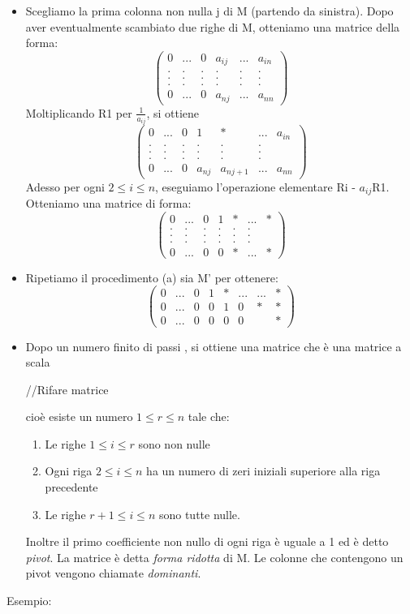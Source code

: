 \documentclass[12pt]{article}
\begin{document}
\begin{itemize}
    \item Scegliamo la prima colonna non nulla j di M (partendo da sinistra). Dopo aver eventualmente scambiato due righe di M, otteniamo una matrice della forma:
    \[\begin{pmatrix}
        0 & ... & 0 & a_{ij} & ... & a_{in}\\
        . & . & . & . & . & .\\
        . & . & . & . & . & .\\
        . & . & . & . & . & .\\
        0 & ... & 0 & a_{nj} & ... & a_{nn}
    \end{pmatrix}\]
    Moltiplicando R1 per $\frac{1}{a_{ij}}$, si ottiene
    \[\begin{pmatrix}
        0 & ... & 0 & 1 & * & ... & a_{in}\\
        . & . & . & . & . & .\\
        . & . & . & . & . & .\\
        . & . & . & . & . & .\\
        0 & ... & 0 & a_{nj} & a_{nj+1} & ... & a_{nn}
    \end{pmatrix}\]
    Adesso per ogni $2 \le i \le n$, eseguiamo l'operazione elementare Ri - $a_{ij}$R1. Otteniamo una matrice di forma:
    \[\begin{pmatrix}
        0 & ... & 0 & 1 & * & ... & * \\
        . & . & . & . & . & .\\
        . & . & . & . & . & .\\
        . & . & . & . & . & .\\
        0 & ... & 0 & 0 & * & ... & *
    \end{pmatrix}\]
    \item Ripetiamo il procedimento (a) sia M' per ottenere:
    \[\begin{pmatrix}
        0 & ... & 0 & 1 & * & ... & ... & *\\
        0 & ... & 0 & 0 & 1 & 0 & * & *\\
        0 & ... & 0 & 0 & 0 & 0 &  & *
    \end{pmatrix}\]
    \item Dopo un numero finito di passi , si ottiene una matrice che è una matrice a scala

    //Rifare matrice

    cioè esiste un numero $1 \le r \le n$ tale che:
    \begin{enumerate}
        \item Le righe $1 \le i \le r$ sono non nulle
        \item Ogni riga $2 \le i \le n$ ha un numero di zeri iniziali superiore alla riga precedente
        \item Le righe $r+1 \le i \le n$ sono tutte nulle.
    \end{enumerate}
    Inoltre il primo coefficiente non nullo di ogni riga è uguale a 1 ed è detto \textit{pivot}. La matrice è detta \textit{forma ridotta} di M. Le colonne che contengono un pivot vengono chiamate \textit{dominanti}.
\end{itemize}
Esempio:
\end{document}
